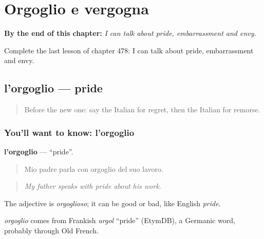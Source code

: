 
\chapter{Orgoglio e vergogna}
\label{ch:it-orgoglio-e-vergogna}

\begin{chapteropening}
\textbf{By the end of this chapter:} \emph{I can talk about pride, embarrassment and envy.}

Complete the last lesson of chapter 478: I can talk about pride, embarrassment and envy.
\end{chapteropening}

\section[l'orgoglio]{l'orgoglio — pride}

\label{lesson:IT-C478-orgoglio}



\begin{quote}
Before the new one: say the Italian for regret, then the Italian for remorse.
\end{quote}

\subsection*{You'll want to know: l'orgoglio}
\textbf{l'orgoglio} — \textquotedblleft{}pride\textquotedblright{}.

\begin{quote}
Mio padre parla con orgoglio del suo lavoro.
\end{quote}

\begin{quote}
\emph{My father speaks with pride about his work.}
\end{quote}

The adjective is \emph{orgoglioso}; it can be good or bad, like English \emph{pride}.

\begin{cousinweb}
\emph{orgoglio} comes from Frankish \emph{urgol} \textquotedblleft{}pride\textquotedblright{} (EtymDB), a Germanic word, probably through Old French.
\end{cousinweb}

